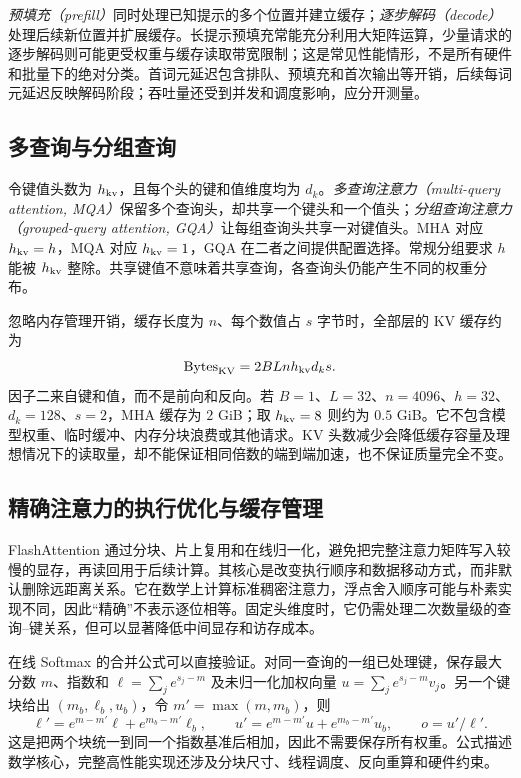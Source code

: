 \documentclass[UTF8,12pt,a4paper,fontset=fandol]{ctexart}
\begin{document}
\emph{预填充（prefill）}同时处理已知提示的多个位置并建立缓存；\emph{逐步解码（decode）}处理后续新位置并扩展缓存。长提示预填充常能充分利用大矩阵运算，少量请求的逐步解码则可能更受权重与缓存读取带宽限制；这是常见性能情形，不是所有硬件和批量下的绝对分类。首词元延迟包含排队、预填充和首次输出等开销，后续每词元延迟反映解码阶段；吞吐量还受到并发和调度影响，应分开测量。

\subsection{多查询与分组查询}

令键值头数为 $h_{\rm kv}$，且每个头的键和值维度均为 $d_k$。\emph{多查询注意力（multi-query attention, MQA）}保留多个查询头，却共享一个键头和一个值头；\emph{分组查询注意力（grouped-query attention, GQA）}让每组查询头共享一对键值头。MHA 对应 $h_{\rm kv}=h$，MQA 对应 $h_{\rm kv}=1$，GQA 在二者之间提供配置选择\cite{ainslie2023}。常规分组要求 $h$ 能被 $h_{\rm kv}$ 整除。共享键值不意味着共享查询，各查询头仍能产生不同的权重分布。

忽略内存管理开销，缓存长度为 $n$、每个数值占 $s$ 字节时，全部层的 KV 缓存约为
\begin{equation}
\operatorname{Bytes}_{\rm KV}=2BLnh_{\rm kv}d_ks.
\label{eq:tr-kv-memory}
\end{equation}
因子二来自键和值，而不是前向和反向。若 $B=1$、$L=32$、$n=4096$、$h=32$、$d_k=128$、$s=2$，MHA 缓存为 $2$ GiB；取 $h_{\rm kv}=8$ 则约为 $0.5$ GiB。它不包含模型权重、临时缓冲、内存分块浪费或其他请求。KV 头数减少会降低缓存容量及理想情况下的读取量，却不能保证相同倍数的端到端加速，也不保证质量完全不变。

\subsection{精确注意力的执行优化与缓存管理}

FlashAttention 通过分块、片上复用和在线归一化，避免把完整注意力矩阵写入较慢的显存，再读回用于后续计算\cite{dao2022}。其核心是改变执行顺序和数据移动方式，而非默认删除远距离关系。它在数学上计算标准稠密注意力，浮点舍入顺序可能与朴素实现不同，因此“精确”不表示逐位相等。固定头维度时，它仍需处理二次数量级的查询--键关系，但可以显著降低中间显存和访存成本。

在线 Softmax 的合并公式可以直接验证。对同一查询的一组已处理键，保存最大分数 $m$、指数和 $\ell=\sum_j e^{s_j-m}$ 及未归一化加权向量 $u=\sum_j e^{s_j-m}v_j$。另一个键块给出 $(m_b,\ell_b,u_b)$，令 $m'=\max(m,m_b)$，则
\begin{equation}
\ell'=e^{m-m'}\ell+e^{m_b-m'}\ell_b,\qquad
u'=e^{m-m'}u+e^{m_b-m'}u_b,
\qquad o=u'/\ell'.
\label{eq:tr-online-softmax}
\end{equation}
这是把两个块统一到同一个指数基准后相加，因此不需要保存所有权重。公式描述数学核心，完整高性能实现还涉及分块尺寸、线程调度、反向重算和硬件约束。
\end{document}
